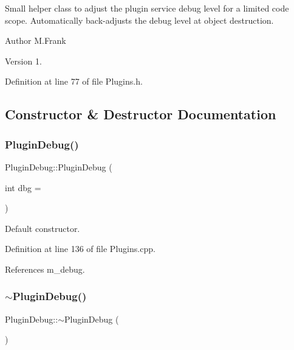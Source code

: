 Small helper class to adjust the plugin service debug level for a limited code scope. Automatically back-\/adjusts the debug level at object destruction.

\begin{DoxyAuthor}{Author}
M.\+Frank 
\end{DoxyAuthor}
\begin{DoxyVersion}{Version}
1. 
\end{DoxyVersion}


Definition at line 77 of file Plugins.\+h.



\subsection{Constructor \& Destructor Documentation}
\hypertarget{struct_d_d4hep_1_1_plugin_debug_a26deb60f08bc415d15c180a7fb5167b5}{}\label{struct_d_d4hep_1_1_plugin_debug_a26deb60f08bc415d15c180a7fb5167b5} 
\subsubsection{\texorpdfstring{Plugin\+Debug()}{PluginDebug()}}
{\footnotesize\ttfamily Plugin\+Debug\+::\+Plugin\+Debug (\begin{DoxyParamCaption}\item[{int}]{dbg = {} }\end{DoxyParamCaption})}



Default constructor. 



Definition at line 136 of file Plugins.\+cpp.



References m\+\_\+debug.

\hypertarget{struct_d_d4hep_1_1_plugin_debug_a5c64d5a172b4d20b94d7a367e09a58f1}{}\label{struct_d_d4hep_1_1_plugin_debug_a5c64d5a172b4d20b94d7a367e09a58f1} 
\subsubsection{\texorpdfstring{$\sim$\+Plugin\+Debug()}{~PluginDebug()}}
{\footnotesize\ttfamily Plugin\+Debug\+::$\sim$\+Plugin\+Debug (\begin{DoxyParamCaption}{ }\end{DoxyParamCaption})}



